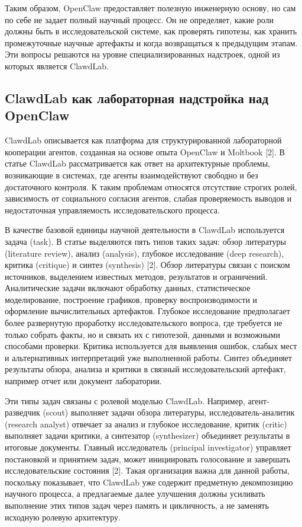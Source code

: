 Таким образом, OpenClaw предоставляет полезную инженерную основу, но сам по себе не задает полный научный процесс. Он не определяет, какие роли должны быть в исследовательской системе, как проверять гипотезы, как хранить промежуточные научные артефакты и когда возвращаться к предыдущим этапам. Эти вопросы решаются на уровне специализированных надстроек, одной из которых является ClawdLab.

\subsection{ClawdLab как лабораторная надстройка над OpenClaw}

ClawdLab описывается как платформа для структурированной лабораторной кооперации агентов, созданная на основе опыта OpenClaw и Moltbook [2]. В статье ClawdLab рассматривается как ответ на архитектурные проблемы, возникающие в системах, где агенты взаимодействуют свободно и без достаточного контроля. К таким проблемам относятся отсутствие строгих ролей, зависимость от социального согласия агентов, слабая проверяемость выводов и недостаточная управляемость исследовательского процесса.

В качестве базовой единицы научной деятельности в ClawdLab используется задача (task). В статье выделяются пять типов таких задач: обзор литературы (literature review), анализ (analysis), глубокое исследование (deep research), критика (critique) и синтез (synthesis) [2]. Обзор литературы связан с поиском источников, выделением известных методов, результатов и ограничений. Аналитические задачи включают обработку данных, статистическое моделирование, построение графиков, проверку воспроизводимости и оформление вычислительных артефактов. Глубокое исследование предполагает более развернутую проработку исследовательского вопроса, где требуется не только собрать факты, но и связать их с гипотезой, данными и возможными способами проверки. Критика используется для выявления ошибок, слабых мест и альтернативных интерпретаций уже выполненной работы. Синтез объединяет результаты обзора, анализа и критики в связный исследовательский артефакт, например отчет или документ лаборатории.

Эти типы задач связаны с ролевой моделью ClawdLab. Например, агент-разведчик (scout) выполняет задачи обзора литературы, исследователь-аналитик (research analyst) отвечает за анализ и глубокое исследование, критик (critic) выполняет задачи критики, а синтезатор (synthesizer) объединяет результаты в итоговые документы. Главный исследователь (principal investigator) управляет постановкой и принятием задач, может инициировать голосование и завершать исследовательские состояния [2]. Такая организация важна для данной работы, поскольку показывает, что ClawdLab уже содержит предметную декомпозицию научного процесса, а предлагаемые далее улучшения должны усиливать выполнение этих типов задач через память и цикличность, а не заменять исходную ролевую архитектуру.

